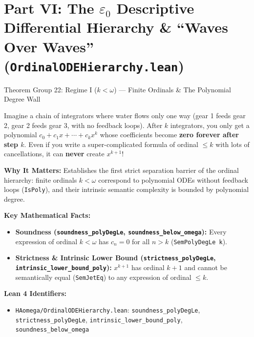 \documentclass[11pt,a4paper]{article}
\newcommand{\lean}[1]{\texttt{\nolinkurl{#1}}}
\begin{document}
\newpage
\section{Part VI: The \texorpdfstring{$\varepsilon_0$}{epsilon\_0} Descriptive Differential Hierarchy \& ``Waves Over Waves'' (\texorpdfstring{\lean{OrdinalODEHierarchy.lean}}{OrdinalODEHierarchy.lean})}

\begin{thmcard}{Theorem Group 22: Regime I (\texorpdfstring{$k < \omega$}{k < omega}) --- Finite Ordinals \& The Polynomial Degree Wall}
\begin{eli5box}
Imagine a chain of integrators where water flows only one way (gear 1 feeds gear 2, gear 2 feeds gear 3, with no feedback loops). After $k$ integrators, you only get a polynomial $c_0 + c_1 x + \cdots + c_k x^k$ whose coefficients become \textbf{zero forever after step $k$}. Even if you write a super-complicated formula of ordinal $\le k$ with lots of cancellations, it can \textbf{never} create $x^{k+1}$!
\end{eli5box}

\textbf{Why It Matters:}
Establishes the first strict separation barrier of the ordinal hierarchy: finite ordinals $k < \omega$ correspond to polynomial ODEs without feedback loops (\lean{IsPoly}), and their intrinsic semantic complexity is bounded by polynomial degree.

\textbf{Key Mathematical Facts:}
\begin{itemize}
  \item \textbf{Soundness (\lean{soundness_polyDegLe}, \lean{soundness_below_omega}):} Every expression of ordinal $k < \omega$ has $c_n = 0$ for all $n > k$ (\lean{SemPolyDegLe k}).
  \item \textbf{Strictness \& Intrinsic Lower Bound (\lean{strictness_polyDegLe}, \lean{intrinsic_lower_bound_poly}):} $x^{k+1}$ has ordinal $k+1$ and cannot be semantically equal (\lean{SemJetEq}) to any expression of ordinal $\le k$.
\end{itemize}

\textbf{Lean 4 Identifiers:}
\begin{itemize}
  \item \lean{HAomega/OrdinalODEHierarchy.lean}: \lean{soundness_polyDegLe}, \lean{strictness_polyDegLe}, \lean{intrinsic_lower_bound_poly}, \lean{soundness_below_omega}
\end{itemize}
\end{thmcard}
\end{document}
